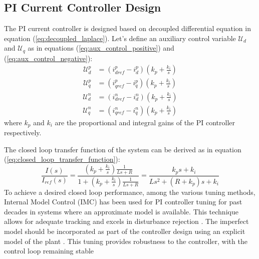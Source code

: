 \subsection{PI Current Controller Design}
The PI current controller is designed based on decoupled differential equation in equation (\ref{eq:decoupled_laplace}).
Let's define an auxiliary control variable $\mathcal{U}_{d}$ and $\mathcal{U}_{q}$ as in equations
(\ref{eq:aux_control_positive}) and (\ref{eq:aux_control_negative}):
\begin{equation}
    \begin{split}
        \mathcal{U}_{d}^{p}    &= (i_{dref}^{p} - i_{d}^{p}) (k_{p} + \frac{k_{i}}{s})\\
        \mathcal{U}_{q}^{p}    &= (i_{qref}^{p} - i_{q}^{p}) (k_{p} + \frac{k_{i}}{s})
    \end{split}
    \label{eq:aux_control_positive}
\end{equation}
\begin{equation}
    \begin{split}
        \mathcal{U}_{d}^{n}    &= (i_{dref}^{n} - i_{d}^{n}) (k_{p} + \frac{k_{i}}{s}) \\
        \mathcal{U}_{q}^{n}    &= (i_{qref}^{n} - i_{q}^{n}) (k_{p} + \frac{k_{i}}{s})
    \end{split}
    \label{eq:aux_control_negative}
\end{equation}
where $k_{p}$ and $k_{i}$ are the proportional and integral gains of the PI controller respectively.\par
The closed loop transfer function of the system can be derived as in equation (\ref{eq:closed_loop_transfer_function}):
\begin{equation}
    \frac{I(s)}{I_{ref}(s)} = \frac{(k_{p} + \frac{k_{i}}{s}) \frac{1}{Ls + R}}{1 + (k_{p} + \frac{k_{i}}{s}) \frac{1}{Ls + R}}
    = \frac{k_{p} s + k_{i}}{L s^{2} + (R + k_{p}) s + k_{i}}
    \label{eq:closed_loop_transfer_function}
\end{equation}
To achieve a desired closed loop performance, among the various tuning methods, Internal Model Control (IMC)
has been used for PI controller tuning for past decades in systems where an approximate model is available.
This technique allows for adequate tracking and excels in disturbance rejection \cite{Shamsuzzoha2012, artIMCPIDShah}.
The imperfect model should be incorporated as part of the controller design using an explicit model of the plant
\cite{Shamsuzzoha2012}. This tuning provides robustness to the controller, with the control loop remaining stable
